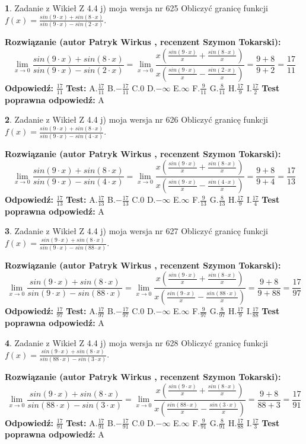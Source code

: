 \documentclass[12pt, a4paper]{article}
\theoremstyle{definition} %
\newtheorem{zad}{}
\newcommand{\zadStart}[1]{\begin{zad}#1\newline}
\newcommand{\zadStop}{\end{zad}}
\newcommand{\rozwStart}[2]{\noindent \textbf{Rozwiązanie (autor #1 , recenzent #2): }\newline}
\newcommand{\rozwStop}{\newline}
\newcommand{\odpStart}{\noindent \textbf{Odpowiedź:}\newline}
\newcommand{\odpStop}{\newline}
\newcommand{\testStart}{\noindent \textbf{Test:}\newline}
\newcommand{\testStop}{\newline}
\newcommand{\kluczStart}{\noindent \textbf{Test poprawna odpowiedź:}\newline}
\newcommand{\kluczStop}{\newline}
\begin{document}
\zadStart{Zadanie z Wikieł Z 4.4 j) moja wersja nr 625}
Obliczyć granicę funkcji $f(x)=\frac{sin(9\cdot x) +sin(8\cdot x)}{sin(9\cdot x) -sin(2\cdot x)}$.
\zadStop
\rozwStart{Patryk Wirkus}{Szymon Tokarski}
$$\lim\limits_{x\to 0}\frac{sin(9\cdot x) +sin(8\cdot x)}{sin(9\cdot x) -sin(2\cdot x)}=\lim\limits_{x\to 0}\frac{x(\frac{sin(9\cdot x)}{x}+\frac{sin(8\cdot x)}{x})}{x(\frac{sin(9\cdot x)}{x}-\frac{sin(2\cdot x)}{x})}=\frac{9+8}{9+2} = \frac{17}{11}$$
\rozwStop
\odpStart
$\frac{17}{11}$
\odpStop
\testStart
A.$\frac{17}{11}$
B.$-\frac{17}{11}$
C.$0$
D.$-\infty$
E.$\infty$
F.$\frac{9}{11}$
G.$\frac{8}{11}$
H.$\frac{17}{9}$
I.$\frac{17}{2}$
\testStop
\kluczStart
A
\kluczStop



\zadStart{Zadanie z Wikieł Z 4.4 j) moja wersja nr 626}
Obliczyć granicę funkcji $f(x)=\frac{sin(9\cdot x) +sin(8\cdot x)}{sin(9\cdot x) -sin(4\cdot x)}$.
\zadStop
\rozwStart{Patryk Wirkus}{Szymon Tokarski}
$$\lim\limits_{x\to 0}\frac{sin(9\cdot x) +sin(8\cdot x)}{sin(9\cdot x) -sin(4\cdot x)}=\lim\limits_{x\to 0}\frac{x(\frac{sin(9\cdot x)}{x}+\frac{sin(8\cdot x)}{x})}{x(\frac{sin(9\cdot x)}{x}-\frac{sin(4\cdot x)}{x})}=\frac{9+8}{9+4} = \frac{17}{13}$$
\rozwStop
\odpStart
$\frac{17}{13}$
\odpStop
\testStart
A.$\frac{17}{13}$
B.$-\frac{17}{13}$
C.$0$
D.$-\infty$
E.$\infty$
F.$\frac{9}{13}$
G.$\frac{8}{13}$
H.$\frac{17}{9}$
I.$\frac{17}{4}$
\testStop
\kluczStart
A
\kluczStop



\zadStart{Zadanie z Wikieł Z 4.4 j) moja wersja nr 627}
Obliczyć granicę funkcji $f(x)=\frac{sin(9\cdot x) +sin(8\cdot x)}{sin(9\cdot x) -sin(88\cdot x)}$.
\zadStop
\rozwStart{Patryk Wirkus}{Szymon Tokarski}
$$\lim\limits_{x\to 0}\frac{sin(9\cdot x) +sin(8\cdot x)}{sin(9\cdot x) -sin(88\cdot x)}=\lim\limits_{x\to 0}\frac{x(\frac{sin(9\cdot x)}{x}+\frac{sin(8\cdot x)}{x})}{x(\frac{sin(9\cdot x)}{x}-\frac{sin(88\cdot x)}{x})}=\frac{9+8}{9+88} = \frac{17}{97}$$
\rozwStop
\odpStart
$\frac{17}{97}$
\odpStop
\testStart
A.$\frac{17}{97}$
B.$-\frac{17}{97}$
C.$0$
D.$-\infty$
E.$\infty$
F.$\frac{9}{97}$
G.$\frac{8}{97}$
H.$\frac{17}{9}$
I.$\frac{17}{88}$
\testStop
\kluczStart
A
\kluczStop



\zadStart{Zadanie z Wikieł Z 4.4 j) moja wersja nr 628}
Obliczyć granicę funkcji $f(x)=\frac{sin(9\cdot x) +sin(8\cdot x)}{sin(88\cdot x) -sin(3\cdot x)}$.
\zadStop
\rozwStart{Patryk Wirkus}{Szymon Tokarski}
$$\lim\limits_{x\to 0}\frac{sin(9\cdot x) +sin(8\cdot x)}{sin(88\cdot x) -sin(3\cdot x)}=\lim\limits_{x\to 0}\frac{x(\frac{sin(9\cdot x)}{x}+\frac{sin(8\cdot x)}{x})}{x(\frac{sin(88\cdot x)}{x}-\frac{sin(3\cdot x)}{x})}=\frac{9+8}{88+3} = \frac{17}{91}$$
\rozwStop
\odpStart
$\frac{17}{91}$
\odpStop
\testStart
A.$\frac{17}{91}$
B.$-\frac{17}{91}$
C.$0$
D.$-\infty$
E.$\infty$
F.$\frac{9}{91}$
G.$\frac{8}{91}$
H.$\frac{17}{88}$
I.$\frac{17}{3}$
\testStop
\kluczStart
A
\kluczStop
\end{document}
